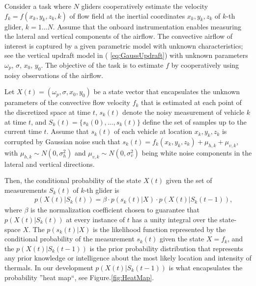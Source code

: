 \documentclass{ifacconf}
\begin{document}
Consider a task where $N$ gliders cooperatively estimate the velocity
$f_k=f(x_k,y_k,z_k,k)$ of flow field  at  the inertial coordinates $x_k,y_k,z_k$  of
$k$-th glider, $k=1...N$. Assume that the onboard instrumentation enables measuring the
lateral and vertical components of the airflow. The convective airflow of interest is
captured by a given parametric model with unknown characteristics; see the vertical
updraft model in ( \ref{eq:GaussUpdraft}) with unknown parameters $\omega_p$, $\sigma$,
$x_0$, $y_0$. The objective of the task is to estimate $f$ by cooperatively using noisy
observations of the airflow.

Let $X(t)=(\omega_p, \sigma, x_0, y_0)$ be a state vector that encapsulates the unknown
parameters of the convective flow velocity $f_k$ that is estimated at each point of the
discretized space at time $t$, $s_k(t)$ denote the noisy measurement of vehicle $k$ at
time $t$, and $S_k(t)=\{s_k(0),...,s_k(t)\}$ define the set of samples up to the current
time $t$. Assume that $s_k(t)$ of each vehicle at location $x_k,y_k,z_k$ is corrupted by
Gaussian noise such that $s_k(t)=f_k(x_k,y_k,z_k)+\mu_{h,k}+\mu_{v,k}$, with
$\mu_{h,k}\sim N(0,\sigma^2_h)$ and $\mu_{v,k}\sim N(0,\sigma^2_v)$ being white noise
components in the lateral and vertical directions.

Then, the conditional probability of the state $X(t)$ given the set of measurements
$S_k(t)$ of $k$-th glider is
\begin{eqnarray}
    && p(X(t)\vert S_k(t))=\beta \cdot p(s_k(t) \vert X)\cdot p(X(t) \vert S_k(t-1)),
    \label{eq:BayesProb}
\end{eqnarray}
where $\beta$ is the normalization coefficient chosen to guarantee that $p(X(t)\vert
S_k(t))$ at every instance of $t$ has a unity integral over the state-space $X$.  The
$p(s_k(t) \vert X)$ is the likelihood function represented by the conditional probability
of the measurement $s_k(t)$ given the state $X=f_k$, and the $p(X(t) \vert S_k(t-1))$ is
the prior probability distribution that represents any prior knowledge or intelligence
about the most likely location and intensity of thermals. In our development $p(X(t)
\vert S_k(t-1))$ is what encapsulates the probability ''heat map``, see
Figure.\ref{fig:HeatMap}.
\end{document}
